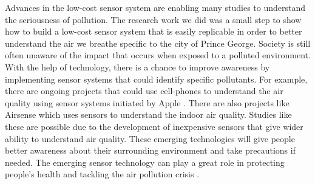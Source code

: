 Advances in the low-cost sensor system are enabling many studies to understand the seriousness of pollution. The research work we did was a small step to show how to build a low-cost sensor system that is easily replicable in order to better understand the air we breathe specific to the city of Prince George. Society is still often unaware of the impact that occurs when exposed to a polluted environment. With the help of technology, there is a chance to improve awareness by implementing sensor systems that could identify specific pollutants. For example, there are ongoing projects that could use cell-phones to understand the air quality using sensor systems initiated by Apple \cite{iphone}. There are also projects like Airsense \cite{Fang2016} which uses sensors to understand the indoor air quality. Studies like these are possible due to the development of inexpensive sensors that give wider ability to understand air quality. These emerging technologies will give people better awareness about their surrounding environment and take precautions if needed. The emerging sensor technology can play a great role in protecting people's health and tackling the air pollution crisis \cite{future}. 
 



